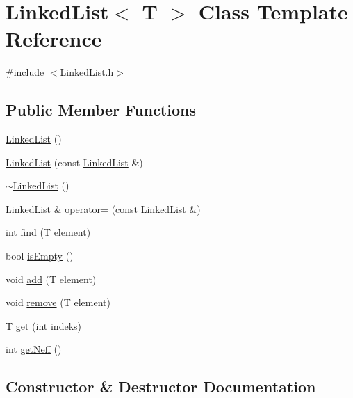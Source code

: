 \hypertarget{classLinkedList}{}\section{Linked\+List$<$ T $>$ Class Template Reference}
\label{classLinkedList}


{\ttfamily \#include $<$Linked\+List.\+h$>$}

\subsection*{Public Member Functions}
\begin{DoxyCompactItemize}
\item 
\mbox{\hyperlink{classLinkedList_a3c20fcfec867e867f541061a09fc640c}{Linked\+List}} ()
\item 
\mbox{\hyperlink{classLinkedList_af82224d7ec3e1a5779e9385bf058b6b5}{Linked\+List}} (const \mbox{\hyperlink{classLinkedList}{Linked\+List}} \&)
\item 
\mbox{\hyperlink{classLinkedList_a7c37609df3b83bc4eb0281b852f93fd7}{$\sim$\+Linked\+List}} ()
\item 
\mbox{\hyperlink{classLinkedList}{Linked\+List}} \& \mbox{\hyperlink{classLinkedList_ab18fc44ff270a0ff32e6d13c5cb75fc5}{operator=}} (const \mbox{\hyperlink{classLinkedList}{Linked\+List}} \&)
\item 
int \mbox{\hyperlink{classLinkedList_a924e217dd525b84492e9f0dc61db96bc}{find}} (T element)
\item 
bool \mbox{\hyperlink{classLinkedList_a7ecbb28e82117a680839ed0dc28ebdce}{is\+Empty}} ()
\item 
void \mbox{\hyperlink{classLinkedList_ab7364799e5965dd59d4f5952cb953287}{add}} (T element)
\item 
void \mbox{\hyperlink{classLinkedList_a6c4973ae9956ddb037a9093cffa2adb1}{remove}} (T element)
\item 
T \mbox{\hyperlink{classLinkedList_a0f812c8aa5443a800c4e3c4bcb5542fa}{get}} (int indeks)
\item 
int \mbox{\hyperlink{classLinkedList_a0f1bf5709295784ae18271b88af50f88}{get\+Neff}} ()
\end{DoxyCompactItemize}


\subsection{Constructor \& Destructor Documentation}
\mbox{\label{classLinkedList_a3c20fcfec867e867f541061a09fc640c}} 
